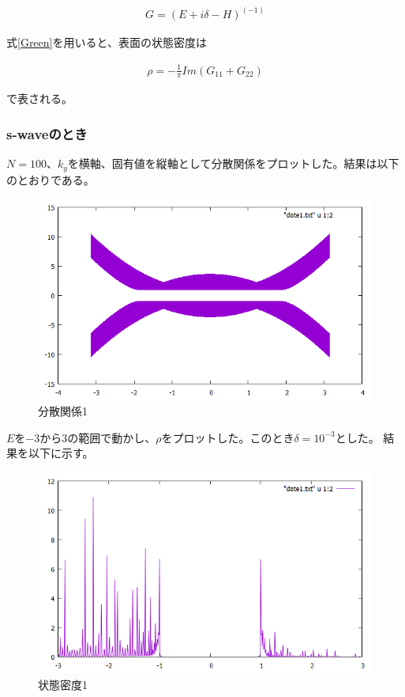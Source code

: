 \documentclass{jsarticle}
\begin{document}
            \begin{align}
                G=(E+i\delta-H)^(-1)
                \label{Green}
            \end{align}

            式\eqref{Green}を用いると、表面の状態密度は
    
            \begin{align}
                \rho=-\frac{1}{\pi}Im(G_{11}+G_{22})
            \end{align}
    
            で表される。

            \subsubsection{s-waveのとき}
            $N=100$、$k_y$を横軸、固有値を縦軸として分散関係をプロットした。結果は以下のとおりである。
    
            \begin{figure}[H]
                \centering
                \includegraphics[scale=0.5]{BdG_bry.png}
                \caption{分散関係1}
                \label{Dispersion1}
            \end{figure}
    
            $E$を$-3$から$3$の範囲で動かし、$\rho$をプロットした。このとき$\delta=10^{-3}$とした。
            結果を以下に示す。
    
            \begin{figure}[H]
                \centering
                \includegraphics[scale=0.5]{LDOS_bry.png}
                \caption{状態密度1}
                \label{LDOS1}
            \end{figure}
    
\end{document}
